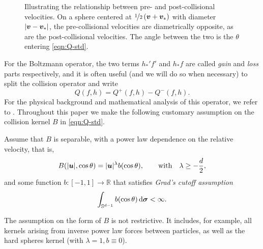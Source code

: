 \begin{figure}
    \centering
    \caption{Illustrating the relationship between pre- and post-collisional velocities. On a sphere centered
        at $\nicefrac{1}{2}\left({\bm v}+{\bm v}_\ast\right)$ with diameter $|{\bm v}-{\bm v}_\ast|$, the pre-collisional
        velocities are diametrically opposite, as are the post-collisional velocities. The angle between the
        two is the $\theta$ entering \eqref{eqn:Q-std}.}
    \label{fig:boltzmann-sphere}
\end{figure}

For the Boltzmann operator, the two terms $h_*'f'$ and $h_*f$ are called {\em gain} and {\em loss} parts
respectively, and it is often useful (and we will do so when necessary) to split the collision operator and
write
\[
    Q(f,h) = Q^{+}(f,h) - Q^{-}(f,h). 
\]
For the physical background and mathematical analysis of this
operator, we refer to
\cite{Cercignani2002bef,Villani2002rmt}. Throughout this paper we make
the following customary assumption on the collision kernel $B$ in
\eqref{eqn:Q-std}.
\begin{assumption} \label{ass:B} Assume that $B$ is separable, with a power law dependence on the relative
    velocity, that is,
\begin{equation}\label{eq:CrossRep}
    B(|{\bm u}|,\cos\theta) = |{\bm u}|^\lambda b(\cos\theta),\qquad
        \text{with}\quad \lambda\geq-\frac{d}{2},
\end{equation}
and some function $b:[-1,1]\to\mathbb{R}$ that satisfies {\em Grad's cutoff assumption}
\begin{equation}\label{eq:Grad}
  \int_{\mathbb{S}^{d-1}}b(\cos\theta) \,\mathrm{d}{\bm\sigma} < \infty.
\end{equation}
\end{assumption}
The assumption on the form of $B$ is not restrictive. It includes, for example, all kernels arising from
inverse power law forces between particles, as well as the hard spheres kernel (with $\lambda=1,b\equiv0$).


